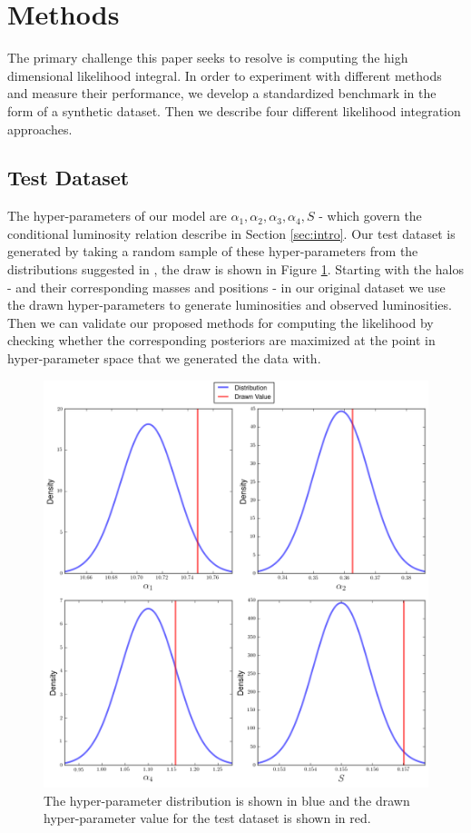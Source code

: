 \documentclass[\docopts]{\docclass}
\begin{document}

\section{Methods}
\label{sec:methods}

The primary challenge this paper seeks to resolve is computing the high dimensional likelihood integral.
In order to experiment with different methods and measure their performance, we develop a standardized benchmark in the form of a synthetic dataset.
Then we describe four different likelihood integration approaches. 

\subsection{Test Dataset}
\label{subsec:testdata}

The hyper-parameters of our model are $\alpha_1, \alpha_2, \alpha_3, \alpha_4, S$ - which govern the conditional luminosity relation describe in Section \ref{sec:intro}.
Our test dataset is generated by taking a random sample of these hyper-parameters from the distributions suggested in \citet{reddick}, the draw is shown in Figure \ref{fig:drawn}.
Starting with the halos - and their corresponding masses and positions - in our original dataset we use the drawn hyper-parameters to generate luminosities and observed luminosities.
Then we can validate our proposed methods for computing the likelihood by checking whether the corresponding posteriors are maximized at the point in hyper-parameter space that we generated the data with. 

\begin{figure}[h]
\centering
\includegraphics[width=0.9\columnwidth]{drawn.png}
\caption{
The hyper-parameter distribution is shown in blue and the drawn hyper-parameter value for the test dataset is shown in red.
\label{fig:drawn}}
\end{figure}
\end{document}
